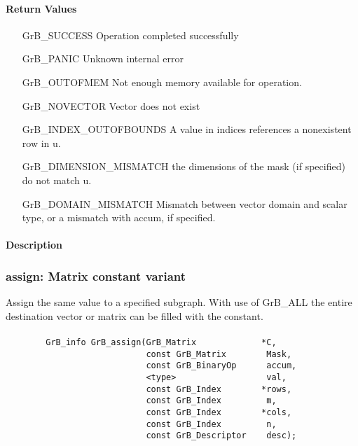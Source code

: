 \paragraph{Return Values}

\begin{itemize}[leftmargin=2.1in]
\item[{\sf GrB\_SUCCESS}]             Operation completed successfully
\item[{\sf GrB\_PANIC}]               Unknown internal error
\item[{\sf GrB\_OUTOFMEM}]            Not enough memory available for operation.
\item[{\sf GrB\_NOVECTOR}]            Vector does not exist
\item[{\sf GrB\_INDEX\_OUTOFBOUNDS}]
        A value in indices references a nonexistent row in {\sf u}.
\item[{\sf GrB\_DIMENSION\_MISMATCH}] 
        the dimensions of the mask (if specified) do not match {\sf u}.
\item[{\sf GrB\_DOMAIN\_MISMATCH}]    Mismatch between vector domain and scalar type,
                                      or a mismatch with {\sf accum}, if specified.
\end{itemize}


\paragraph{Description}

\subsubsection{{\sf assign}: Matrix constant variant}

Assign the same value to a specified subgraph.  With use of {\sf GrB\_ALL} the entire
destination vector or matrix can be filled with the constant.

\paragraph{\syntax}

\begin{verbatim}
        GrB_info GrB_assign(GrB_Matrix             *C,
                            const GrB_Matrix        Mask,
                            const GrB_BinaryOp      accum,
                            <type>                  val,
                            const GrB_Index        *rows,
                            const GrB_Index         m,
                            const GrB_Index        *cols,
                            const GrB_Index         n,
                            const GrB_Descriptor    desc);
\end{verbatim}

